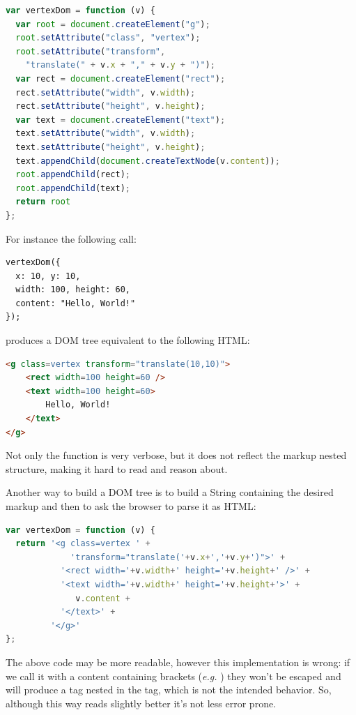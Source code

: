 \documentclass[american,english,runningheads]{llncs}
\newcommand{\eg}{\emph{e.g.}}
\begin{document}
\begin{lstlisting}[language=JavaScript,label=dom-api,caption=DOM fragment creation using the native API]
var vertexDom = function (v) {
  var root = document.createElement("g");
  root.setAttribute("class", "vertex");
  root.setAttribute("transform",
    "translate(" + v.x + "," + v.y + ")");
  var rect = document.createElement("rect");
  rect.setAttribute("width", v.width);
  rect.setAttribute("height", v.height);
  var text = document.createElement("text");
  text.setAttribute("width", v.width);
  text.setAttribute("height", v.height);
  text.appendChild(document.createTextNode(v.content));
  root.appendChild(rect);
  root.appendChild(text);
  return root
};
\end{lstlisting}

For instance the following call:
\begin{lstlisting}
vertexDom({
  x: 10, y: 10,
  width: 100, height: 60,
  content: "Hello, World!"
});
\end{lstlisting}
produces a DOM tree equivalent to the following HTML:
\begin{lstlisting}[language=HTML]
<g class=vertex transform="translate(10,10)">
    <rect width=100 height=60 />
    <text width=100 height=60>
        Hello, World!
    </text>
</g>
\end{lstlisting}

Not only the  function is very verbose, but it does not reflect the markup nested structure, making it hard to read and reason about.

Another way to build a DOM tree is to build a String containing the desired markup and then to ask the browser to parse it as HTML:

\begin{lstlisting}[language=JavaScript]
var vertexDom = function (v) {
  return '<g class=vertex ' +
             'transform="translate('+v.x+','+v.y+')">' +
           '<rect width='+v.width+' height='+v.height+' />' +
           '<text width='+v.width+' height='+v.height+'>' +
              v.content +
           '</text>' +
         '</g>'
};
\end{lstlisting}

The above code may be more readable, however this implementation is wrong: if we call it with a content containing brackets (\eg{} ) they won’t be escaped and will produce a  tag nested in the  tag, which is not the intended behavior. So, although this way reads slightly better it’s not less error prone.
\end{document}
